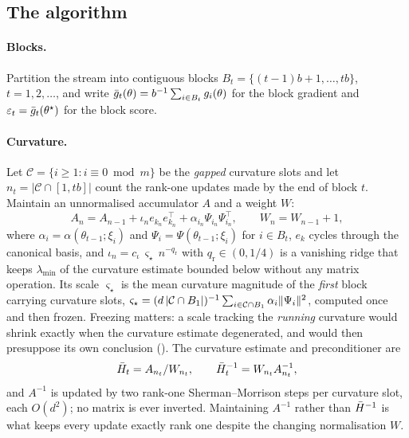 \subsection{The algorithm}

\paragraph{Blocks.} Partition the stream into contiguous blocks $B_t=\{(t-1)b+1,\dots,tb\}$,
$t=1,2,\dots$, and write $\bar{g}_t(\theta)=b^{-1}\sum_{i\in B_t}g_i(\theta)$ for the block gradient and
$\varepsilon_t=\bar{g}_t(\theta^\star)$ for the block score.

\paragraph{Curvature.} Let $\mathcal{C}=\{i\ge 1: i\equiv 0 \bmod m\}$ be the \emph{gapped}
curvature slots and let $n_t=|\mathcal{C}\cap[1,tb]|$ count the rank-one updates made by the end of
block $t$. Maintain an unnormalised accumulator $A$ and a weight $W$:
\begin{equation}
A_{n}=A_{n-1}+\iota_n e_{k_n}e_{k_n}^{\!\top}+\alpha_{i_n}\Psi_{i_n}\Psi_{i_n}^{\!\top},
\qquad W_n=W_{n-1}+1,
\label{eq:curv}
\end{equation}
where $\alpha_{i}=\alpha(\theta_{t-1};\xi_{i})$ and $\Psi_i=\Psi(\theta_{t-1};\xi_i)$ for
$i\in B_t$, $e_{k}$ cycles through the canonical basis, and
$\iota_n=c_\iota\, \varsigma_\star\, n^{-q_{\mathrm r}}$ with $q_{\mathrm r}\in(0,1/4)$ is a
vanishing ridge that keeps $\lambda_{\min}$ of the curvature estimate bounded below without any
matrix operation. Its scale $\varsigma_\star$ is the mean curvature magnitude of the \emph{first}
block carrying curvature slots,
$\varsigma_\star=(d\,|\mathcal{C}\cap B_1|)^{-1}\sum_{i\in\mathcal{C}\cap B_1}\alpha_i\lVert \Psi_i \rVert^2$,
computed once and then frozen. Freezing matters: a scale tracking the \emph{running} curvature would shrink exactly when the curvature
estimate degenerated, and  would then presuppose its own conclusion
(). The curvature estimate and preconditioner are
\begin{equation}
\bar{H}_t=A_{n_t}/W_{n_t},\qquad \bar{H}_t^{-1}=W_{n_t}A_{n_t}^{-1},
\label{eq:Hbar}
\end{equation}
and $A^{-1}$ is updated by two rank-one Sherman--Morrison steps per curvature slot, each $O(d^2)$;
no matrix is ever inverted. Maintaining $A^{-1}$ rather than $\bar{H}^{-1}$ is what keeps every update
exactly rank one despite the changing normalisation $W$.

